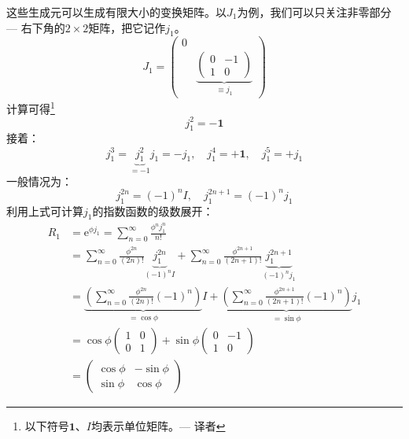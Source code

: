 这些生成元可以生成有限大小的变换矩阵。以$J_1$为例，我们可以只关注非零部分 --- 右下角的$2 \times 2$矩阵，把它记作$j_1$。
\begin{equation}
\label{equ3.65}
J_1 =
	\begin{pmatrix}
		0 & \\
		  &	\underbrace{
		  	\begin{pmatrix}
		  		0 & -1 \\
		  		1 & 0
		  	\end{pmatrix}
		  	}_{\equiv j_1}
	\end{pmatrix}
\end{equation}
计算可得\footnote{以下符号$\mathbf{1}$、$I$均表示单位矩阵。--- 译者}
\begin{equation}
\label{equ3.66}
j_1^2 = -\mathbf{1}
\end{equation}
接着：
\begin{equation}
\label{equ3.67}
j_1^3 = \underbrace{j_1^2}_{= -1} j_1 = -j_1, \quad j_1^4 = + \mathbf{1}, \quad j_1^5 = +j_1
\end{equation}
一般情况为：
\begin{equation}
\label{equ3.68}
j_1^{2n} = (-1)^n I, \quad j_1^{2n + 1} = (-1)^n j_1
\end{equation}
利用上式可计算$j_1$的指数函数的级数展开：
\begin{align}
R_1 &= \mathrm{e}^{\phi j_1} = \sum_{n = 0}^{\infty} \frac{\phi^n j_1^n}{n!} \nonumber \\
    &= \sum_{n = 0}^{\infty} \frac{\phi^{2n}}{(2n)!} \underbrace{j_1^{2n}}_{(-1)^n I} + \sum_{n = 0}^{\infty} \frac{\phi^{2n + 1}}{ (2n + 1)!} \underbrace{j_1^{2n + 1}}_{(-1)^n j_1} \nonumber \\
    &= \underbrace{\left( \sum_{n = 0}^{\infty} \frac{\phi^{2n}}{(2n)!} (-1)^n  \right)}_{ = \cos \phi} I + \underbrace{\left( \sum_{n = 0}^{\infty} \frac{\phi^{2n + 1}}{(2n + 1)!} (-1)^n  \right)}_{ = \sin \phi} j_1 \nonumber \\
    &= \cos \phi \begin{pmatrix}
    				1 & 0 \\ 0 & 1
    			 \end{pmatrix}
       + \sin \phi 	\begin{pmatrix}
       					0 & -1 \\ 1 & 0
       				\end{pmatrix} \nonumber \\
    &=	\begin{pmatrix}
    		\cos \phi & -\sin \phi \\
    		\sin \phi & \cos \phi
    	\end{pmatrix}
\end{align}
